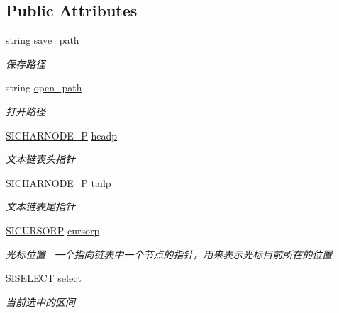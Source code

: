 \subsection*{Public Attributes}
\begin{DoxyCompactItemize}
\item 
\mbox{\label{class_s_i_t_e_x_t_a0d602676667071382638f8b27850c6a6}} 
string \hyperlink{class_s_i_t_e_x_t_a0d602676667071382638f8b27850c6a6}{save\+\_\+path}
\begin{DoxyCompactList}\small\item\em 保存路径 \end{DoxyCompactList}\item 
\mbox{\label{class_s_i_t_e_x_t_a7d7def7333970c953f9daebfe22155a8}} 
string \hyperlink{class_s_i_t_e_x_t_a7d7def7333970c953f9daebfe22155a8}{open\+\_\+path}
\begin{DoxyCompactList}\small\item\em 打开路径 \end{DoxyCompactList}\item 
\hyperlink{class_s_i_c_h_a_r_n_o_d_e}{S\+I\+C\+H\+A\+R\+N\+O\+D\+E\+\_\+P} \hyperlink{class_s_i_t_e_x_t_a50c3c59ac0a71a940d688e9d4d901bee}{headp}
\begin{DoxyCompactList}\small\item\em 文本链表头指针 \end{DoxyCompactList}\item 
\hyperlink{class_s_i_c_h_a_r_n_o_d_e}{S\+I\+C\+H\+A\+R\+N\+O\+D\+E\+\_\+P} \hyperlink{class_s_i_t_e_x_t_a65fc82385d60763d2f3bcca67abf99bc}{tailp}
\begin{DoxyCompactList}\small\item\em 文本链表尾指针 \end{DoxyCompactList}\item 
\hyperlink{class_s_i_c_h_a_r_n_o_d_e}{S\+I\+C\+U\+R\+S\+O\+RP} \hyperlink{class_s_i_t_e_x_t_a1841f3bacc1a8c468203f44e904afc73}{cursorp}
\begin{DoxyCompactList}\small\item\em 光标位置~\newline
一个指向链表中一个节点的指针，用来表示光标目前所在的位置 \end{DoxyCompactList}\item 
\hyperlink{struct_s_i_r_a_n_g_e}{S\+I\+S\+E\+L\+E\+CT} \hyperlink{class_s_i_t_e_x_t_a536f8decde35b0149619ca1719c887b0}{select}
\begin{DoxyCompactList}\small\item\em 当前选中的区间 \end{DoxyCompactList}\item 

\end{DoxyCompactItemize}
